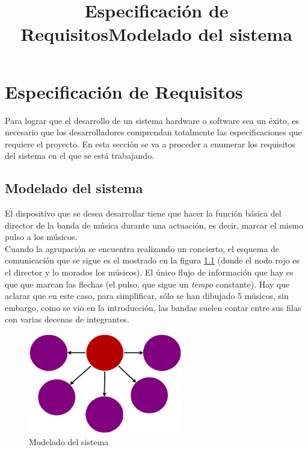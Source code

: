 \chapter{Especificación de Requisitos}
\label{cap:EspecificaciondeRequisitos}
\title{Especificación de Requisitos}

Para lograr que el desarrollo de un sistema hardware o software sea un éxito,
es necesario que los desarrolladores comprendan totalmente las especificaciones que
requiere el proyecto. En esta sección se va a proceder a enumerar los requisitos del
sistema en el que se está trabajando.\\

\title{Modelado del sistema}
\section{
Modelado del sistema
}

El dispositivo que se desea desarrollar tiene que hacer la función básica
del director de la banda de música durante una actuación, es decir,
marcar el mismo pulso a los músicos.\\

Cuando la agrupación se encuentra realizando un concierto, el
esquema de comunicación que se sigue es el mostrado en la figura \ref{fig:modeladoconceptual}
(donde el nodo rojo es el director y lo morados los músicos). El único flujo de información
que hay es que que marcan las flechas (el pulso, que sigue un \textit{tempo} constante). Hay que
aclarar que en este caso, para simplificar, sólo se han dibujado 5 músicos,
sin embargo, como se vio en la introducción, las bandas suelen contar entre sus filas con
varias decenas de integrantes.\\


\begin{figure}[htb]
\centering
\includegraphics[width=0.6\textwidth]{./imagenes/modeladoconceptual}
\caption{Modelado del sistema} \label{fig:modeladoconceptual}
\end{figure}

